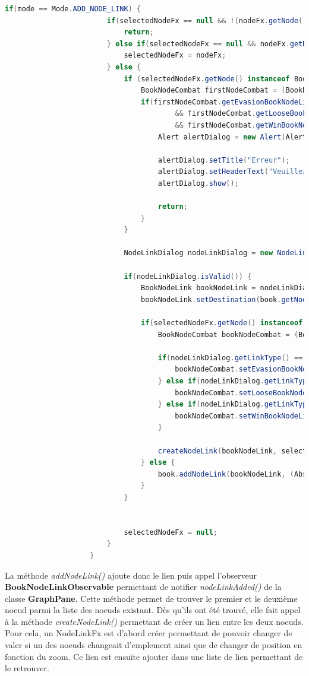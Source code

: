				\begin{lstlisting}[gobble=20, language=java, caption=Classe NodeFxListener avec le mode ADD NODE LINK]
					if(mode == Mode.ADD_NODE_LINK) {
						if(selectedNodeFx == null && !(nodeFx.getNode() instanceof AbstractBookNodeWithChoices)) {
							return;
						} else if(selectedNodeFx == null && nodeFx.getNode() instanceof AbstractBookNodeWithChoices) {
							selectedNodeFx = nodeFx;
						} else {
							if (selectedNodeFx.getNode() instanceof BookNodeCombat){
								BookNodeCombat firstNodeCombat = (BookNodeCombat) selectedNodeFx.getNode();
								if(firstNodeCombat.getEvasionBookNodeLink() != null
										&& firstNodeCombat.getLooseBookNodeLink() != null
										&& firstNodeCombat.getWinBookNodeLink() != null) {
									Alert alertDialog = new Alert(Alert.AlertType.ERROR);

									alertDialog.setTitle("Erreur");
									alertDialog.setHeaderText("Veuillez supprimer un lien de victoire / defaite / evasion pour pouvoir rajouter un autre lien.");
									alertDialog.show();

									return;
								}
							}

							NodeLinkDialog nodeLinkDialog = new NodeLinkDialog(selectedNodeFx.getNode(), book);

							if(nodeLinkDialog.isValid()) {
								BookNodeLink bookNodeLink = nodeLinkDialog.getNodeLink();
								bookNodeLink.setDestination(book.getNodeIndex(nodeFx.getNode()));

								if(selectedNodeFx.getNode() instanceof BookNodeCombat) {
									BookNodeCombat bookNodeCombat = (BookNodeCombat) selectedNodeFx.getNode();

									if(nodeLinkDialog.getLinkType() == NodeLinkDialog.EVASION) {
										bookNodeCombat.setEvasionBookNodeLink(bookNodeLink);
									} else if(nodeLinkDialog.getLinkType() == NodeLinkDialog.PERDRE) {
										bookNodeCombat.setLooseBookNodeLink(bookNodeLink);
									} else if(nodeLinkDialog.getLinkType() == NodeLinkDialog.GAGNE) {
										bookNodeCombat.setWinBookNodeLink(bookNodeLink);
									}

									createNodeLink(bookNodeLink, selectedNodeFx, nodeFx);
								} else {
									book.addNodeLink(bookNodeLink, (AbstractBookNodeWithChoices) selectedNodeFx.getNode());
								}
							}


							selectedNodeFx = null;
						}
					}
				\end{lstlisting}

				La méthode \textit{addNodeLink()} ajoute donc le lien puis appel l'observeur \textbf{BookNodeLinkObservable} permettant de notifier \textit{nodeLinkAdded()} de la classe \textbf{GraphPane}. Cette méthode permet de trouver le premier et le deuxième noeud parmi la liste des noeuds existant. Dès qu'ils ont été trouvé, elle fait appel à la méthode \textit{createNodeLink()} permettant de créer un lien entre les deux noeuds.
				Pour cela, un NodeLinkFx est d'abord créer permettant de pouvoir changer de valer si un des noeuds changeait d'emplement ainsi que de changer de position en fonction du zoom. Ce lien est ensuite ajouter dans une liste de lien permettant de le retrouver.

